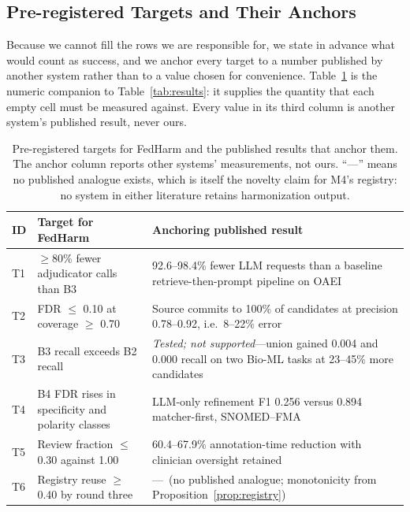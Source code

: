 \documentclass[conference]{IEEEtran}
\begin{document}
\subsection{Pre-registered Targets and Their Anchors}
\label{sec:targets}

Because we cannot fill the rows we are responsible for, we state in advance what would count as success, and we anchor every target to a number published by another system rather than to a value chosen for convenience. Table~\ref{tab:targets} is the numeric companion to Table~\ref{tab:results}: it supplies the quantity that each empty cell must be measured against. Every value in its third column is another system's published result, never ours.

\begin{table}[t]
\caption{Pre-registered targets for FedHarm and the published results that anchor them. The anchor column reports other systems' measurements, not ours. ``---'' means no published analogue exists, which is itself the novelty claim for M4's registry: no system in either literature retains harmonization output.}
\label{tab:targets}
\centering
\footnotesize
\begin{tabular}{@{}p{0.72cm}p{2.15cm}p{3.63cm}@{}}
\toprule
\textbf{ID} & \textbf{Target for FedHarm} & \textbf{Anchoring published result} \\
\midrule
T1 & $\ge$80\% fewer adjudicator calls than B3 & 92.6--98.4\% fewer LLM requests than a baseline retrieve-then-prompt pipeline on OAEI~\cite{b54} \\
T2 & FDR $\le$ 0.10 at coverage $\ge$ 0.70 & Source commits to 100\% of candidates at precision 0.78--0.92, i.e.\ 8--22\% error~\cite{b1} \\
T3 & B3 recall exceeds B2 recall & \emph{Tested; not supported}---union gained 0.004 and 0.000 recall on two Bio-ML tasks at 23--45\% more candidates~\cite{b1} \\
T4 & B4 FDR rises in specificity and polarity classes & LLM-only refinement F1 0.256 versus 0.894 matcher-first, SNOMED--FMA~\cite{b56,b54} \\
T5 & Review fraction $\le$ 0.30 against 1.00 & 60.4--67.9\% annotation-time reduction with clinician oversight retained~\cite{b40} \\
T6 & Registry reuse $\ge$ 0.40 by round three & ---\ (no published analogue; monotonicity from Proposition~\ref{prop:registry}) \\
\bottomrule
\end{tabular}
\end{table}
\end{document}
